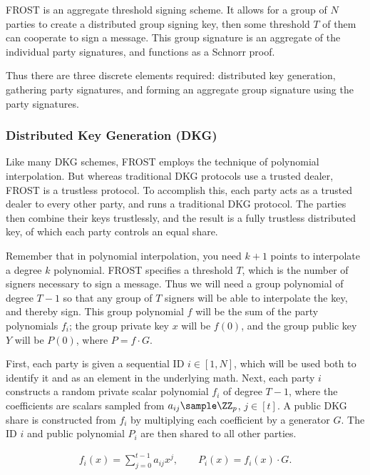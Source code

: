 \documentclass{article}
\theoremstyle{definition}
\theoremstyle{remark}
\begin{document}
FROST is an aggregate threshold signing scheme.  It allows for a group of $N$ parties to create a distributed group signing key, then some threshold $T$ of them can cooperate to sign a message.  This group signature is an aggregate of the individual party signatures, and functions as a Schnorr proof.

Thus there are three discrete elements required: distributed key generation, gathering party signatures, and forming an aggregate group signature using the party signatures.

\subsubsection{
  Distributed Key Generation (DKG)
}

Like many DKG schemes, FROST employs the technique of polynomial interpolation.  But whereas traditional DKG protocols use a trusted dealer, FROST is a trustless protocol.  To accomplish this, each party acts as a trusted dealer to every other party, and runs a traditional DKG protocol.  The parties then combine their keys trustlessly, and the result is a fully trustless distributed key, of which each party controls an equal share.

Remember that in polynomial interpolation, you need $k+1$ points to interpolate a degree $k$ polynomial.  FROST specifies a threshold $T$, which is the number of signers necessary to sign a message.  Thus we will need a group polynomial of degree $T-1$ so that any group of $T$ signers will be able to interpolate the key, and thereby sign.  This group polynomial $f$ will be the sum of the party polynomials $f_i$; the group private key $x$ will be $f(0)$, and the group public key $Y$ will be $P(0)$, where $P = f \cdot G$.

First, each party is given a sequential ID $i \in [1, N]$, which will be used both to identify it and as an element in the underlying math.  Next, each party $i$ constructs a random private scalar polynomial $f_i$ of degree $T-1$, where the coefficients are scalars sampled from $a_{ij} \sample \ZZ_p$, $j \in [t]$.  A public DKG share is constructed from $f_i$ by multiplying each coefficient by a generator $G$.  The ID $i$ and public polynomial $P_i$ are then shared to all other parties.

\begin{align}\label{equation:wsts-polynomial}
f_i(x) = \sum_{j=0}^{t-1} a_{ij}x^j, \qquad P_i(x) = f_{i}(x) \cdot G.
\end{align}
\end{document}

